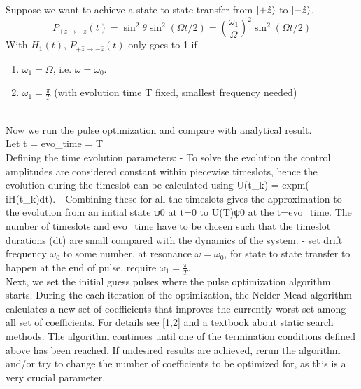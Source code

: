 \documentclass[12pt]{article}
\begin{document}
Suppose we want to achieve a state-to-state transfer from $\ket{+\hat{z}}$ to $\ket{-\hat{z}}$,  
$$
P_{+\hat{z} \rightarrow-\hat{z}}(t) = \sin ^2 \theta \sin ^2(\Omega t / 2)=\left(\frac{\omega_1}{\Omega}\right)^2 \sin ^2(\Omega t / 2)
$$
With $H_1(t)$, $P_{+\hat{z} \rightarrow-\hat{z}}(t)$ only goes to 1 if 
\begin{enumerate}
    \item $\omega_1 = \Omega$, i.e. $\omega = \omega_0$.
    \item $\omega_1 = \frac{\pi}{T}$ (with evolution time T fixed, smallest frequency needed)
\end{enumerate}

\\

Now we run the pulse optimization and compare with analytical result. 
\\
Let t = evo\_time = T
\\
Defining the time evolution parameters:
- To solve the evolution the control amplitudes are considered constant within piecewise timeslots, hence the evolution during the timeslot can be calculated using U(t\_k) = expm(-iH(t\_k)dt). 
- Combining these for all the timeslots gives the approximation to the evolution from an initial state ψ0 at t=0 to U(T)ψ0 at the t=evo\_time. The number of timeslots and evo\_time have to be chosen such that the timeslot durations (dt) are small compared with the dynamics of the system.
- set drift frequency $\omega_0$ to some number, at resonance $\omega = \omega_0$, for state to state transfer to happen at the end of pulse, require $\omega_1 = \frac{\pi}{T}$.
\\
Next, we set the initial guess pulses where the pulse optimization algorithm starts. 
During the each iteration of the optimization, the Nelder-Mead algorithm calculates a new set of coefficients that improves the currently worst set among all set of coefficients. For details see [1,2] and a textbook about static search methods. 
The algorithm continues until one of the termination conditions defined above has been reached. If undesired results are achieved, rerun the algorithm and/or try to change the number of coefficients to be optimized for, as this is a very crucial parameter.  
\end{document}
